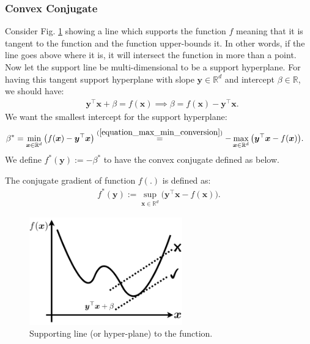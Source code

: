\documentclass[lang=cn,10pt]{gorgeousnbook}
\numberwithin{equation}{section}%
\numberwithin{figure}{section}%
\begin{document}

\subsubsection{Convex Conjugate}

Consider Fig. \ref{figure_convex_conjugate} showing a line which supports the function $f$ meaning that it is tangent to the function and the function upper-bounds it. In other words, if the line goes above where it is, it will intersect the function in more than a point. 
Now let the support line be multi-dimensional to be a support hyperplane. 
For having this tangent support hyperplane with slope $\boldsymbol{y} \in \mathbb{R}^d$ and intercept $\beta \in \mathbb{R}$, we should have:
\begin{align*}
& \boldsymbol{y}^\top \boldsymbol{x} + \beta = f(\boldsymbol{x}) \implies \beta = f(\boldsymbol{x}) - \boldsymbol{y}^\top \boldsymbol{x}.
\end{align*}
We want the smallest intercept for the support hyperplane:
\begin{align*}
& \beta^* = \min_{\boldsymbol{x} \in \mathbb{R}^d} \big( f(\boldsymbol{x}) - \boldsymbol{y}^\top \boldsymbol{x} \big) \overset{(\ref{equation_max_min_conversion})}{=} - \max_{\boldsymbol{x} \in \mathbb{R}^d} \big( \boldsymbol{y}^\top \boldsymbol{x} - f(\boldsymbol{x}) \big).
\end{align*}
We define $f^*(\boldsymbol{y}) := -\beta^*$ to have the convex conjugate defined as below.

\begin{definition}
The conjugate gradient of function $f(.)$ is defined as:
\begin{align}\label{equation_convex_conjugate}
f^*(\boldsymbol{y}) := \sup_{\boldsymbol{x} \in \mathbb{R}^d} \big( \boldsymbol{y}^\top \boldsymbol{x} - f(\boldsymbol{x}) \big). 
\end{align}
\end{definition}

\begin{figure}[!t]
\centering
\includegraphics[width=2.6in]{./images/convex_conjugate}
\caption{Supporting line (or hyper-plane) to the function.}
\label{figure_convex_conjugate}
\end{figure}
\end{document}
